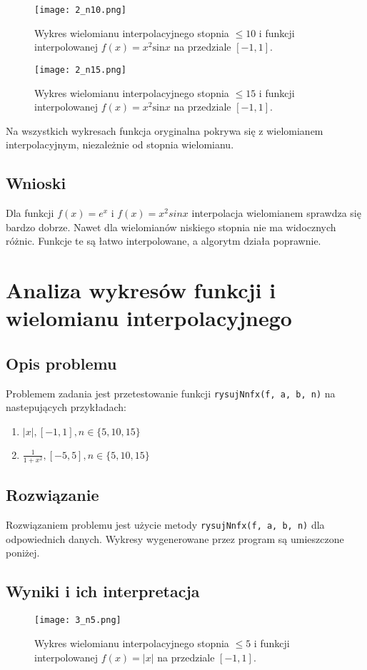 \documentclass{article}
\begin{document}
\begin{figure}[H]
    \centering
    \texttt{[image: 2\_n10.png]}
    \caption{Wykres wielomianu interpolacyjnego stopnia $\leq 10$ i funkcji interpolowanej $f(x) = x^2\text{sin}x$ na przedziale $[-1, 1]$.}
    \label{fig:zad5_f2_10}
\end{figure}

\begin{figure}[H]
    \centering
    \texttt{[image: 2\_n15.png]}
    \caption{Wykres wielomianu interpolacyjnego stopnia $\leq 15$ i funkcji interpolowanej $f(x) = x^2\text{sin}x$ na przedziale $[-1, 1]$.}
    \label{fig:zad5_f2_15}
\end{figure}

Na wszystkich wykresach funkcja oryginalna pokrywa się z wielomianem interpolacyjnym, niezależnie od stopnia wielomianu.
\subsection{Wnioski}
Dla funkcji $f(x) = e^x$ i $f(x) = x^2sinx$ interpolacja wielomianem sprawdza się bardzo dobrze. Nawet dla wielomianów niskiego stopnia nie ma widocznych różnic. Funkcje te są łatwo interpolowane, a algorytm działa poprawnie.
\section{Analiza wykresów funkcji i wielomianu interpolacyjnego}
\subsection{Opis problemu}
Problemem zadania jest przetestowanie funkcji  \texttt{rysujNnfx(f, a, b, n)} na nastepujących przykładach:
\begin{enumerate}
    \item $|x|, [-1, 1], n \in \{5, 10, 15\}$
    \item $\frac{1}{1 + x^2}, [-5, 5], n \in \{5, 10, 15\}$
\end{enumerate}
\subsection{Rozwiązanie}
Rozwiązaniem problemu jest użycie metody \texttt{rysujNnfx(f, a, b, n)} dla odpowiednich danych. Wykresy wygenerowane przez program są umieszczone poniżej.
\subsection{Wyniki i ich interpretacja}
\begin{figure}[H]
    \centering
    \texttt{[image: 3\_n5.png]}
    \caption{Wykres wielomianu interpolacyjnego stopnia $\leq 5$ i funkcji interpolowanej $f(x) = |x|$ na przedziale $[-1, 1]$.}
    \label{fig:zad6_f1_5}
\end{figure}
\end{document}

